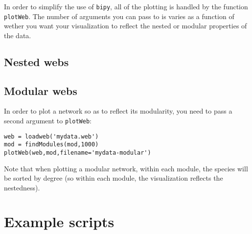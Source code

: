 \documentclass[10pt]{scrbook}
\begin{document}
In order to simplify the use of \texttt{bipy}, all of the plotting is handled by the function \texttt{plotWeb}. The number of arguments you can pass to is varies as a function of wether you want your visualization to reflect the nested or modular properties of the data.

\section{Nested webs}



\section{Modular webs}

In order to plot a network so as to reflect its modularity, you need to pass a second argument to \texttt{plotWeb}:

\begin{lstlisting}[caption=plotting a modular network]
web = loadweb('mydata.web')
mod = findModules(mod,1000)
plotWeb(web,mod,filename='mydata-modular')
\end{lstlisting}

Note that when plotting a modular network, within each module, the species will be sorted by degree (so within each module, the visualization reflects the nestedness).

\chapter{Example scripts\label{c:ex}}

%
%
\end{document}

